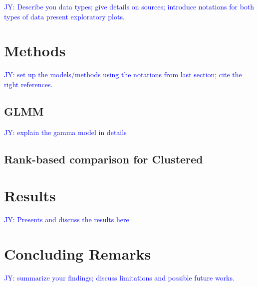 \documentclass[12pt, letterpaper, titlepage]{article}
\newcommand{\jy}[1]{\textcolor{blue}{JY: #1}}
\begin{document}
\jy{Describe you data types; give details on sources; introduce notations for
  both types of data
  present exploratory plots.}


\section{Methods} \label{sec:meth}

\jy{set up the models/methods using the notations from last section; cite the
  right references.}

\subsection{GLMM}

\jy{explain the gamma model in details}

\subsection{Rank-based comparison for Clustered}


\section{Results}

\jy{Presents and discuss the results here}

\section{Concluding Remarks}

\jy{summarize your findings; discuss limitations and possible future works.}
\end{document}
